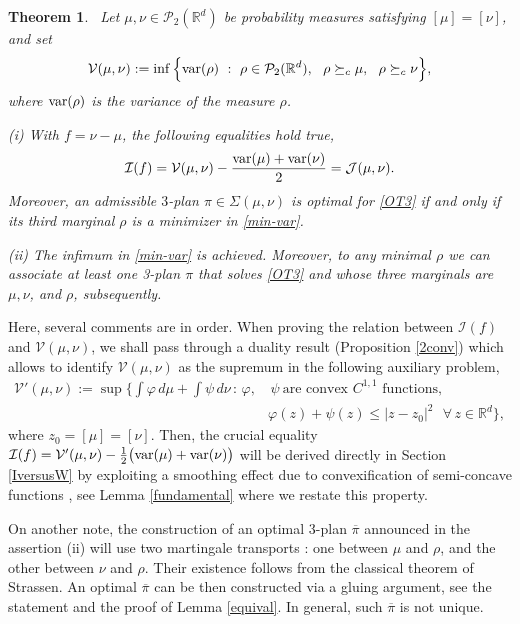 \documentclass[11pt,letterpaper,reqno]{amsart}
\newtheorem{theorem}{Theorem}[section]
\theoremstyle{definition}
\numberwithin{equation}{section}
\newcommand{\med}{\medskip\noindent}
\def\f{\varphi}
\newcommand{\R}{\mathbb{R}}
\newcommand{\Rd}{\R^d}
\newcommand{\ov}{\overline}
\newcommand{\JJ}{\mathcal{J}}
\newcommand{\var}{{\rm{var}}}
\newcommand{\PP}{\mathcal{P}}
\newcommand{\I}{\mathcal{I}}
\newcommand{\V}{{\mathcal{V}}}
\begin{document}
\begin{theorem}\label{thm2-intro}\ 
Let $\mu, \nu \in \PP_2(\R^d)$ be  probability measures satisfying $[\mu]=[\nu]$, and set
\begin{equation} \label{min-var} 
\V(\mu,\nu):= \inf \Big\{ \var (\rho) \ :\  \rho\in \PP_2(\R^d), \ \ 
\rho \succeq_c \mu  ,\ \ \rho \succeq_c \nu \Big\}  , \end{equation}
where $\var (\rho)$ is the variance of  the measure $\rho$. 

\med (i) With $f = \nu-\mu$, the following equalities hold true,
\begin{align*}
	 \I(f) = \V(\mu,\nu)  - \frac{ \var (\mu) + \var (\nu)}{2} =  \JJ(\mu,\nu).
\end{align*}
Moreover, an admissible $3$-plan $\pi\in \Sigma(\mu,\nu)$ is optimal  for  \eqref{OT3} if and only if its third marginal $\rho$ 
is a minimizer in \eqref{min-var}. 

\med (ii) The infimum in \eqref{min-var} is achieved. Moreover,  to any minimal $\rho$  we can associate at least one  3-plan  $\pi$ that solves \eqref{OT3} and  whose three  marginals are  $\mu,\nu$, and $\rho$, subsequently.
\end{theorem}

Here, several comments are in order. When proving the relation between $\I(f)$ and $\V(\mu,\nu)$, we shall
 pass through a duality result (Proposition \ref{2conv}) which allows to identify $\V(\mu,\nu)$ as  the supremum  in the following auxiliary problem,
\begin{align*}
	 \V'(\mu,\nu) :=  \sup \bigg\{ \int \f\, d\mu + \int \psi\, d\nu \, :\,  \f ,&\, \psi \ \text{are convex  $C^{1,1}$ functions} , \\
	  &\f(z)+\psi(z)\le |z-z_0|^2 \ \ \ \forall \, z \in\Rd\bigg\},
\end{align*}
where $z_0=[\mu]=[\nu]$.
Then, the crucial equality $ \I(f)  = \V'(\mu,\nu) - \frac{1}{2} \big(\var(\mu) + \var(\nu) \big)$ will be derived directly in Section \ref{IversusW}  by exploiting a smoothing effect due to convexification of semi-concave functions \cite{cependello1998,dephilippis2015, azagra2018}, see
 Lemma \ref{fundamental} where we restate this property. 
 

On another note, the construction of an optimal 3-plan $\ov\pi$ announced in the assertion (ii) will use two martingale  transports \cite{beiglbock2013}: one between $\mu$ and $\rho$, and the other between $\nu$ and $\rho$. Their existence follows from the classical theorem of Strassen.  An optimal $\ov\pi$ can be then constructed via a gluing  argument, see the statement and the proof of Lemma  \ref{equival}. In general, such $\ov\pi$ is not unique. 
 
\end{document}
